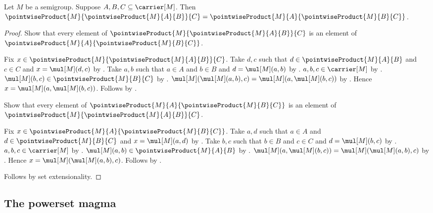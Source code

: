 \begin{theorem}\label{pointwise_product_associative}
    Let $M$ be a semigroup.
    Suppose $A,B,C\subseteq\carrier[M]$.
    Then
        $\pointwiseProduct{M}{\pointwiseProduct{M}{A}{B}}{C}
            =\pointwiseProduct{M}{A}{\pointwiseProduct{M}{B}{C}}$.
\end{theorem}
\begin{proof}
    Show that every element of
        $\pointwiseProduct{M}{\pointwiseProduct{M}{A}{B}}{C}$ is an element of
        $\pointwiseProduct{M}{A}{\pointwiseProduct{M}{B}{C}}$.
    \begin{subproof}
        Fix $x\in\pointwiseProduct{M}{\pointwiseProduct{M}{A}{B}}{C}$.
        Take $d,c$ such that $d\in\pointwiseProduct{M}{A}{B}$ and
            $c\in C$ and $x=\mul[M](d,c)$
            by .
        Take $a,b$ such that $a\in A$ and $b\in B$ and
            $d=\mul[M](a,b)$ by .
        $a,b,c\in\carrier[M]$ by .
        $\mul[M](b,c)\in\pointwiseProduct{M}{B}{C}$
            by .
        $\mul[M](\mul[M](a,b),c)=\mul[M](a,\mul[M](b,c))$
            by .
        Hence $x=\mul[M](a,\mul[M](b,c))$.
        Follows by .
    \end{subproof}

    Show that every element of
        $\pointwiseProduct{M}{A}{\pointwiseProduct{M}{B}{C}}$ is an element of
        $\pointwiseProduct{M}{\pointwiseProduct{M}{A}{B}}{C}$.
    \begin{subproof}
        Fix $x\in\pointwiseProduct{M}{A}{\pointwiseProduct{M}{B}{C}}$.
        Take $a,d$ such that $a\in A$ and
            $d\in\pointwiseProduct{M}{B}{C}$ and
            $x=\mul[M](a,d)$ by .
        Take $b,c$ such that $b\in B$ and $c\in C$ and
            $d=\mul[M](b,c)$ by .
        $a,b,c\in\carrier[M]$ by .
        $\mul[M](a,b)\in\pointwiseProduct{M}{A}{B}$
            by .
        $\mul[M](a,\mul[M](b,c))=\mul[M](\mul[M](a,b),c)$
            by .
        Hence $x=\mul[M](\mul[M](a,b),c)$.
        Follows by .
    \end{subproof}
    Follows by set extensionality.
\end{proof}

\subsection{The powerset magma}

